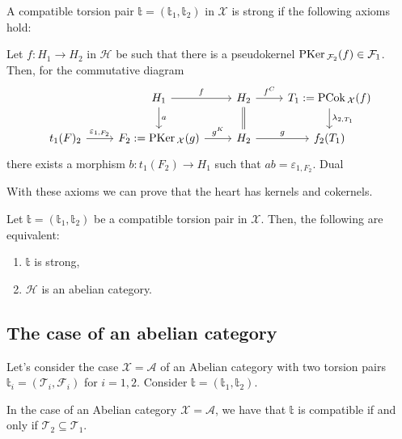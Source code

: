 \begin{definition}
  A compatible torsion pair $\mathbb{t}=(\mathbb{t}_1,\mathbb{t}_2)$ in $\mathcal{X}$
  is strong if the following axioms hold:
  \begin{torsionaxioms}
    \setcounter{enumi}{3}
    \item Let $f:H_1\to H_2$ in $\mathcal{H}$ be such that there is a pseudokernel
    $\mathrm{\textup{PKer\,}}_{\mathcal{F}_2}(f)\in\mathcal{F}_1$. Then, for the commutative diagram
    \begin{equation*}
      \begin{tikzcd}
        & H_1\arrow{d}{a}\arrow{r}{f}
          & H_2\arrow[equal]{d}\arrow{r}{f^C}
            & T_1:=\PCok_\mathcal{X}(f)\arrow{d}{\lambda_{2,T_1}}\\
        t_1(F)_2\arrow{r}{\varepsilon_{1,F_2}}
        & F_2:=\PKer_\mathcal{X}(g)\arrow{r}{g^K}
          & H_2\arrow{r}{g}
            & f_2(T_1)
      \end{tikzcd}
    \end{equation*}
    there exists a morphism $b:t_1(F_2)\to H_1$ such that $ab=\varepsilon_{1,F_2}$.
    \varitem{^\ast} Dual
  \end{torsionaxioms}
\end{definition}

With these axioms we can prove that the heart has kernels and cokernels.

\begin{thm}
  Let $\mathbb{t}=(\mathbb{t}_1,\mathbb{t}_2)$ be a compatible torsion pair in $\mathcal{X}$. Then, the following are
  equivalent:
  \begin{enumerate}[ref=(a)]
    \item $\mathbb{t}$ is strong,
    \item $\mathcal{H}$ is an abelian category.
  \end{enumerate}
\end{thm}

\subsection{The case of an abelian category}

Let's consider the case $\mathcal{X}=\mathcal{A}$ of an Abelian category with
two torsion pairs $\mathbb{t}_i=(\mathcal{T}_i,\mathcal{F}_i)$ for $i=1,2$.
Consider $\mathbb{t}=(\mathbb{t}_1,\mathbb{t}_2)$.

\begin{rmk}\label{rmk:abeliancats}
  In the case of an Abelian category $\mathcal{X}=\mathcal{A}$, we have that
  $\mathbb{t}$ is compatible if and only if $\mathcal{T}_2\subseteq\mathcal{T}_1$.
\end{rmk}

